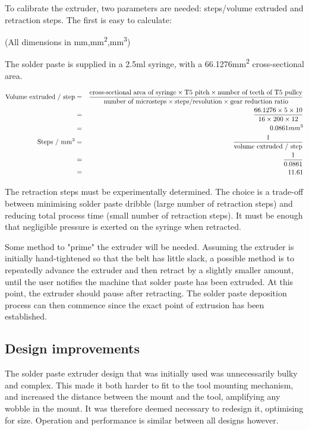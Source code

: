 To calibrate the extruder, two parameters are needed: steps/volume extruded and retraction steps. The first is easy to calculate:

(All dimensions in mm,mm\textsuperscript{2},mm\textsuperscript{3})

The solder paste is supplied in a 2.5ml syringe, with a 66.1276mm\textsuperscript{2} cross-sectional area.

\begin{eqnarray}
\text{Volume extruded / step} &=& \frac{\text{cross-sectional area of syringe} \times \text{T5 pitch} \times \text{number of teeth of T5 pulley}}{\text{number of microsteps} \times \text{steps/revolution} \times \text{gear reduction ratio}} \nonumber \\
&=&\frac{66.1276 \times 5 \times 10}{16 \times 200 \times 12} \nonumber \\
&=&0.0861mm\textsuperscript{3} \nonumber \\
	\text{Steps / mm\textsuperscript{3}} &=& \frac{1} {\text{volume extruded / step}} \nonumber \\
	&=& \frac{1}{ 0.0861} \nonumber \\
	&=& 11.61 \nonumber
\end{eqnarray}

The retraction steps must be experimentally determined. The choice is a trade-off between minimising solder paste dribble (large number
of retraction steps) and reducing total process time (small number of retraction steps). It must be enough that negligible pressure is
exerted on the syringe when retracted.

Some method to "prime" the extruder will be needed. Assuming the extruder is initially hand-tightened so that the belt has little slack,
a possible method is to repeatedly advance the extruder and then retract by a slightly smaller amount, until the user notifies the machine
that solder paste has been extruded. At this point, the extruder should pause after retracting. The solder paste deposition process can
then commence since the exact point of extrusion has been established. 

\subsection{Design improvements}
The solder paste extruder design that was initially used was unnecessarily bulky and complex. This made it both harder to fit to the tool mounting mechanism, and increased the
distance between the mount and the tool, amplifying any wobble in the mount. It was therefore deemed necessary to redesign it, optimising for size. Operation and performance
is similar between all designs however.

